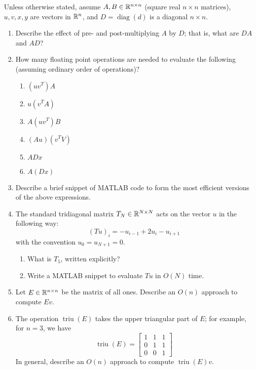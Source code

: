 \documentclass[12pt, leqno]{article}
\begin{document}
Unless otherwise stated, assume $A, B \in \mathbb{R}^{n \times n}$
(square real $n \times n$ matrices), $u, v, x, y$ are vectors in
$\mathbb{R}^n$, and $D = \operatorname{diag}(d)$ is a diagonal $n \times n$.
\begin{enumerate}
\item
  Describe the effect of pre- and post-multiplying $A$ by $D$;
  that is, what are $DA$ and $AD$?
\item
  How many floating point operations are needed to evaluate the
  following (assuming ordinary order of operations)?
  \begin{enumerate}
  \item $(uv^T) A$
  \item $u (v^T A)$
  \item $A (u v^T) B$
  \item $(A u) (v^T V)$
  \item $A D x$
  \item $A (Dx)$
  \end{enumerate}
\item
  Describe a brief snippet of MATLAB code to form the most efficient
  versions of the above expressions.
\item
  The standard tridiagonal matrix $T_N \in \mathbb{R}^{N \times N}$ acts
  on the vector $u$ in the following way:
  \[
    (Tu)_i = -u_{i-1} + 2u_i - u_{i+1}
  \]
  with the convention $u_0 = u_{N+1} = 0$.
  \begin{enumerate}
  \item What is $T_5$, written explicitly?
  \item Write a MATLAB snippet to evaluate $Tu$ in $O(N)$ time.
  \end{enumerate}
\item
  Let $E \in \mathbb{R}^{n \times n}$ be the matrix of all ones.
  Describe an $O(n)$ approach to compute $Ev$.
\item
  The operation $\operatorname{triu}(E)$ takes the upper triangular
  part of $E$; for example, for $n = 3$, we have
  \[
  \operatorname{triu}(E) =
  \begin{bmatrix}
    1 & 1 & 1 \\
    0 & 1 & 1 \\
    0 & 0 & 1 
  \end{bmatrix}
  \]
  In general, describe an $O(n)$ approach to compute
  $\operatorname{triu}(E) v$.
\end{enumerate}
\end{document}
